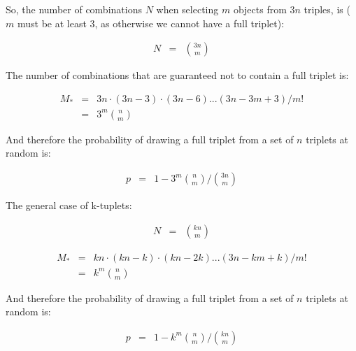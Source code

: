 \documentclass[onecolumn]{article}
\begin{document}
So, the number of combinations $N$ when selecting $m$ objects from $3n$ triples, is
($m$ must be at least 3, as otherwise we cannot have a full triplet):

\begin{eqnarray}
\nonumber N &=& \binom{3n}{m}
\end{eqnarray}

The number of combinations that are guaranteed not to contain a full triplet is:

\begin{eqnarray}
\nonumber M_* &=& 3n \cdot (3n-3) \cdot (3n-6) ... (3n-3m+3) / m! \\
            &=& 3^m \binom{n}{m}
\end{eqnarray}

And therefore the probability of drawing a full triplet from a set of $n$ triplets
at random is:

\begin{eqnarray}
\nonumber p &=& 1 - 3^m \binom{n}{m} \bigg/ \binom{3n}{m}
\end{eqnarray}

The general case of k-tuplets:

\begin{eqnarray}
\nonumber N &=& \binom{kn}{m}
\end{eqnarray}

\begin{eqnarray}
\nonumber M_* &=& kn \cdot (kn-k) \cdot (kn-2k) ... (3n-km+k) / m! \\
            &=& k^m \binom{n}{m}
\end{eqnarray}

And therefore the probability of drawing a full triplet from a set of $n$ triplets
at random is:

\begin{eqnarray}
\nonumber p &=& 1 - k^m \binom{n}{m} \bigg/ \binom{kn}{m}
\end{eqnarray}
\end{document}
